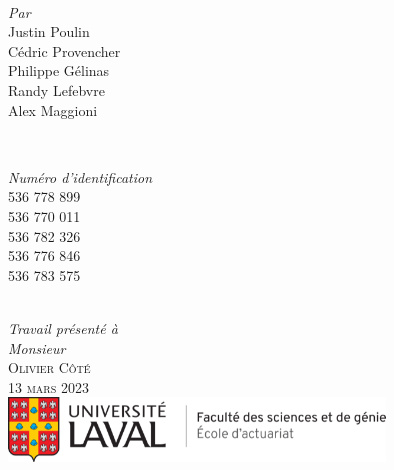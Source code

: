 \begin{titlepage}
\HRule \\[2cm]
\begin{minipage}{0.4\textwidth}
    \begin{flushleft} \large
    \emph{Par}\\
        Justin Poulin\\
        Cédric Provencher\\
        Philippe Gélinas\\
        Randy Lefebvre\\
        Alex Maggioni
    \end{flushleft}
\end{minipage}
~%
\begin{minipage}{0.4\textwidth}
    \begin{flushright} \large
    \emph{Numéro d'identification}\\
        536 778 899\\
        536 770 011\\
        536 782 326\\
        536 776 846\\
        536 783 575
    \end{flushright}
\end{minipage} \\[1.0cm]
\emph{Travail présenté à} \\
\emph{Monsieur} \\[0.1cm]
\textsc{\Large Olivier \textsc{Côté}}\\[1.0cm]
\textsc{\large 13 mars 2023}\\[1cm] %

\includegraphics[width = 10cm]{ul-actuariat}\\[1.5cm]
 
\vfill %

\end{titlepage}
%